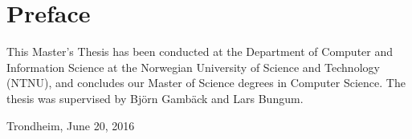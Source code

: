 \section*{Preface}

This Master's Thesis has been conducted at the Department of Computer and Information Science at the Norwegian University of Science and Technology (NTNU), and concludes our Master of Science degrees in Computer Science. The thesis was supervised by Björn Gambäck and Lars Bungum.

\vfill

\hfill \thesisAuthor

\hfill Trondheim, June 20, 2016
